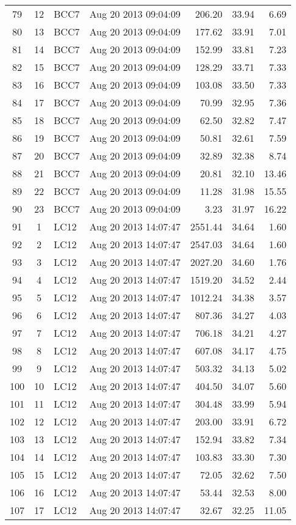 \begin{longtable}{ccllrrr}
79&12&BCC7&Aug 20 2013 09:04:09&206.20&33.94&6.69\\
80&13&BCC7&Aug 20 2013 09:04:09&177.62&33.91&7.01\\
81&14&BCC7&Aug 20 2013 09:04:09&152.99&33.81&7.23\\
82&15&BCC7&Aug 20 2013 09:04:09&128.29&33.71&7.33\\
83&16&BCC7&Aug 20 2013 09:04:09&103.08&33.50&7.33\\
84&17&BCC7&Aug 20 2013 09:04:09&70.99&32.95&7.36\\
85&18&BCC7&Aug 20 2013 09:04:09&62.50&32.82&7.47\\
86&19&BCC7&Aug 20 2013 09:04:09&50.81&32.61&7.59\\
87&20&BCC7&Aug 20 2013 09:04:09&32.89&32.38&8.74\\
88&21&BCC7&Aug 20 2013 09:04:09&20.81&32.10&13.46\\
89&22&BCC7&Aug 20 2013 09:04:09&11.28&31.98&15.55\\
90&23&BCC7&Aug 20 2013 09:04:09&3.23&31.97&16.22\\
\hline 
91&1&LC12&Aug 20 2013 14:07:47&2551.44&34.64&1.60\\
92&2&LC12&Aug 20 2013 14:07:47&2547.03&34.64&1.60\\
93&3&LC12&Aug 20 2013 14:07:47&2027.20&34.60&1.76\\
94&4&LC12&Aug 20 2013 14:07:47&1519.20&34.52&2.44\\
95&5&LC12&Aug 20 2013 14:07:47&1012.24&34.38&3.57\\
96&6&LC12&Aug 20 2013 14:07:47&807.36&34.27&4.03\\
97&7&LC12&Aug 20 2013 14:07:47&706.18&34.21&4.27\\
98&8&LC12&Aug 20 2013 14:07:47&607.08&34.17&4.75\\
99&9&LC12&Aug 20 2013 14:07:47&503.32&34.13&5.02\\
100&10&LC12&Aug 20 2013 14:07:47&404.50&34.07&5.60\\
101&11&LC12&Aug 20 2013 14:07:47&304.48&33.99&5.94\\
102&12&LC12&Aug 20 2013 14:07:47&203.00&33.91&6.72\\
103&13&LC12&Aug 20 2013 14:07:47&152.94&33.82&7.34\\
104&14&LC12&Aug 20 2013 14:07:47&103.83&33.30&7.30\\
105&15&LC12&Aug 20 2013 14:07:47&72.05&32.62&7.50\\
106&16&LC12&Aug 20 2013 14:07:47&53.44&32.53&8.00\\
107&17&LC12&Aug 20 2013 14:07:47&32.67&32.25&11.05\\

\end{longtable}
